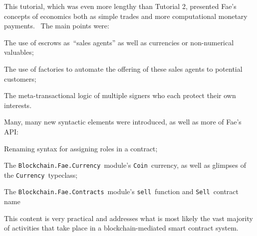 \documentclass[11pt]{article}
\begin{document}
This tutorial, which was even more lengthy than Tutorial 2, presented Fae's concepts of economics both as simple trades and more computational monetary payments.  The main points were:


\vspace{5.5pt}\begin{longitem}
\item{The use of escrows as “sales agents” as well as currencies or non-numerical valuables;}
\item{The use of factories to automate the offering of these sales agents to potential customers;}
\item{The meta-transactional logic of multiple signers who each protect their own interests.}
\end{longitem}

\vspace{11pt}

Many, many new syntactic elements were introduced, as well as more of Fae's API:


\vspace{5.5pt}\begin{longitem}
\item{Renaming syntax for assigning roles in a contract;}
\item{The \texttt{Blockchain.Fae.Currency} module's \texttt{Coin} currency, as well as glimpses of the \texttt{Currency} typeclass;}
\item{The \texttt{Blockchain.Fae.Contracts} module's \texttt{sell} function and \texttt{Sell} contract name}
\end{longitem}

\vspace{11pt}

This content is very practical and addresses what is most likely the vast majority of activities that take place in a blockchain-mediated smart contract system.
\end{document}
